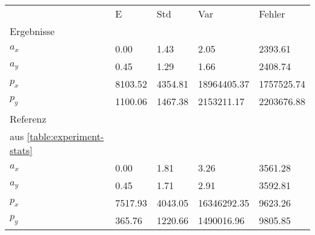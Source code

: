 \begin{tabular}{l|l|l|l|l}

     & E   & Std    & Var    & Fehler \\
\hhline{=|=|=|=|=}

Ergebnisse & & & & \\
$a_x$  &         0.00 &         1.43 &         2.05 &      2393.61 \\
$a_y$  &         0.45 &         1.29 &         1.66 &      2408.74 \\
$p_x$  &      8103.52 &      4354.81 &  18964405.37 &   1757525.74 \\
$p_y$  &      1100.06 &      1467.38 &   2153211.17 &   2203676.88 \\

\hline
Referenz & & & & \\
aus \ref{table:experiment-stats} & & & & \\
$a_x$  &         0.00 &         1.81 &         3.26 &      3561.28 \\
$a_y$  &         0.45 &         1.71 &         2.91 &      3592.81 \\
$p_x$  &      7517.93 &      4043.05 &  16346292.35 &      9623.26 \\
$p_y$  &       365.76 &      1220.66 &   1490016.96 &      9805.85 \\
\end{tabular}
